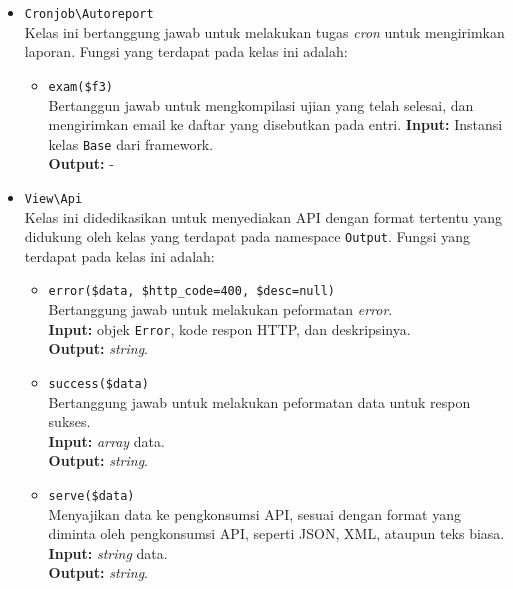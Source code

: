 \begin{itemize}
        \item \texttt{Cronjob\textbackslash Autoreport} \\
            Kelas ini bertanggung jawab untuk melakukan tugas \textit{cron}
            untuk mengirimkan laporan. Fungsi yang terdapat pada kelas ini
            adalah:
            \begin{itemize}
                \item \texttt{exam(\$f3)} \\
                    Bertanggun jawab untuk mengkompilasi ujian yang telah
                    selesai, dan mengirimkan email ke daftar yang disebutkan
                    pada entri. \textbf{Input:} Instansi kelas \texttt{Base}
                    dari framework.\\
                    \textbf{Output:} -
            \end{itemize}
            
        \item \texttt{View\textbackslash Api} \\
            Kelas ini didedikasikan untuk menyediakan API dengan format tertentu
            yang didukung oleh kelas yang terdapat pada namespace
            \texttt{Output}. Fungsi yang terdapat pada kelas ini adalah:
            \begin{itemize}
                \item \texttt{error(\$data, \$http\_code=400, \$desc=null)} \\
                    Bertanggung jawab untuk melakukan peformatan \textit{error}.
                    \\
                    \textbf{Input:} objek \texttt{Error}, kode respon HTTP, dan
                    deskripsinya.\\
                    \textbf{Output:} \textit{string}.
                    
                \item \texttt{success(\$data)} \\
                    Bertanggung jawab untuk melakukan peformatan data untuk
                    respon sukses. \\
                    \textbf{Input:} \textit{array} data.\\
                    \textbf{Output:} \textit{string}.
                
                \item \texttt{serve(\$data)} \\
                    Menyajikan data ke pengkonsumsi API, sesuai dengan format
                    yang diminta oleh pengkonsumsi API, seperti JSON, XML,
                    ataupun teks biasa.\\
                    \textbf{Input:} \textit{string} data.\\
                    \textbf{Output:} \textit{string}.
            \end{itemize}
            

\end{itemize}
